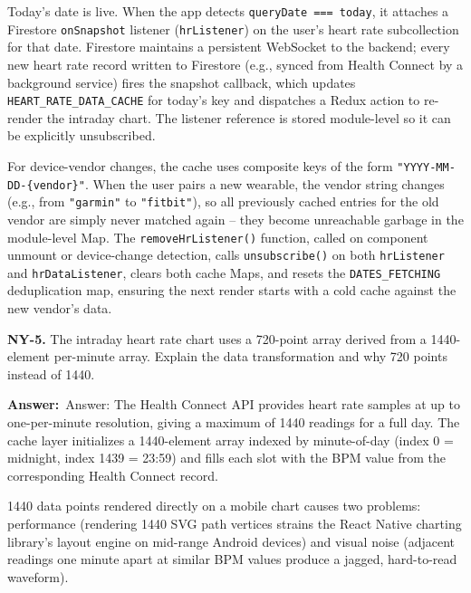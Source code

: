 \documentclass[letterpaper,10pt]{article}
\newlength{\boxwidth}
\newcommand{\answerlabel}{\noindent\textbf{\textcolor{answerblue}{Answer:}}~}
\begin{document}
Today's date is live. When the app detects \texttt{queryDate === today}, it attaches a Firestore \texttt{onSnapshot} listener (\texttt{hrListener}) on the user's heart rate subcollection for that date. Firestore maintains a persistent WebSocket to the backend; every new heart rate record written to Firestore (e.g., synced from Health Connect by a background service) fires the snapshot callback, which updates \texttt{HEART\_RATE\_DATA\_CACHE} for today's key and dispatches a Redux action to re-render the intraday chart. The listener reference is stored module-level so it can be explicitly unsubscribed.

For device-vendor changes, the cache uses composite keys of the form \texttt{"YYYY-MM-DD-\{vendor\}"}. When the user pairs a new wearable, the vendor string changes (e.g., from \texttt{"garmin"} to \texttt{"fitbit"}), so all previously cached entries for the old vendor are simply never matched again -- they become unreachable garbage in the module-level Map. The \texttt{removeHrListener()} function, called on component unmount or device-change detection, calls \texttt{unsubscribe()} on both \texttt{hrListener} and \texttt{hrDataListener}, clears both cache Maps, and resets the \texttt{DATES\_FETCHING} deduplication map, ensuring the next render starts with a cold cache against the new vendor's data.

\vspace{6pt}

\colorbox{qbg}{\begin{minipage}{\boxwidth}
\textbf{NY-5.} The intraday heart rate chart uses a 720-point array derived from a 1440-element per-minute array. Explain the data transformation and why 720 points instead of 1440.
\end{minipage}}

\vspace{2pt}
\answerlabel{Answer:} The Health Connect API provides heart rate samples at up to one-per-minute resolution, giving a maximum of 1440 readings for a full day. The cache layer initializes a 1440-element array indexed by minute-of-day (index 0 = midnight, index 1439 = 23:59) and fills each slot with the BPM value from the corresponding Health Connect record.

1440 data points rendered directly on a mobile chart causes two problems: performance (rendering 1440 SVG path vertices strains the React Native charting library's layout engine on mid-range Android devices) and visual noise (adjacent readings one minute apart at similar BPM values produce a jagged, hard-to-read waveform).
\end{document}
